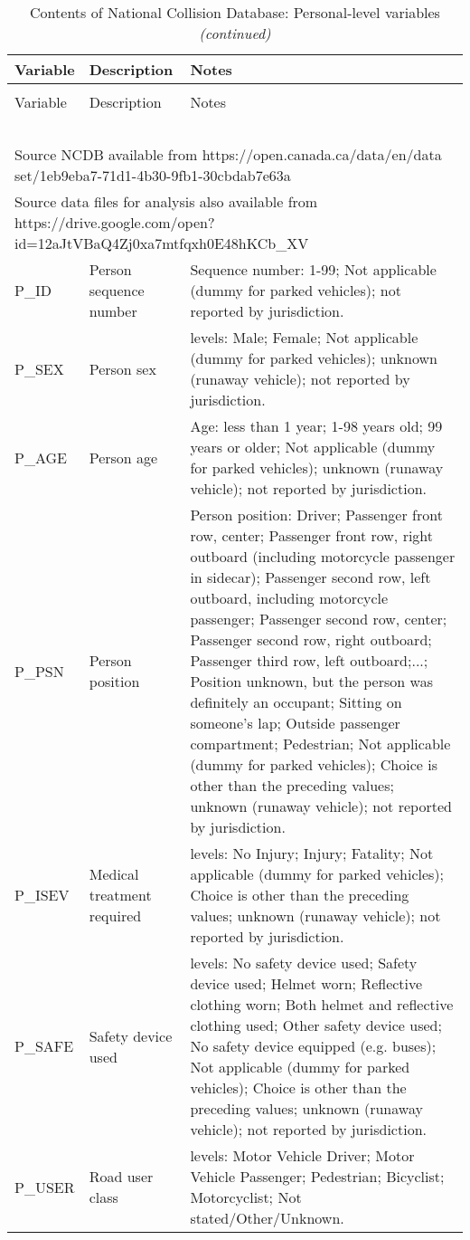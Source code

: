 \documentclass[]{elsarticle} %
\begin{document}
\begin{longtable}[t]{ll>{\raggedright\arraybackslash}p{32em}}
\caption{\label{tab:ncdb-descriptives-person}\label{tab:ncdb-descriptives-person}Contents of National Collision Database: Personal-level variables}\\
\toprule
Variable & Description & Notes\\
\midrule
\endfirsthead
\caption[]{\label{tab:ncdb-descriptives-person}Contents of National Collision Database: Personal-level variables \textit{(continued)}}\\
\toprule
Variable & Description & Notes\\
\midrule
\endhead
\
\endfoot
\bottomrule
\multicolumn{3}{l}{\textit{Note: }}\\
\multicolumn{3}{l}{Source NCDB available from https://open.canada.ca/data/en/data set/1eb9eba7-71d1-4b30-9fb1-30cbdab7e63a}\\
\multicolumn{3}{l}{Source data files for analysis also available from https://drive.google.com/open?id=12aJtVBaQ4Zj0xa7mtfqxh0E48hKCb\_XV}\\
\endlastfoot
\rowcolor{gray!6}  P\_ID & Person sequence number & Sequence number: 1-99; Not applicable (dummy for parked vehicles); not reported by jurisdiction.\\
P\_SEX & Person sex & 5 levels: Male; Female; Not applicable (dummy for parked vehicles); unknown (runaway vehicle); not reported by jurisdiction.\\
\rowcolor{gray!6}  P\_AGE & Person age & Age: less than 1 year; 1-98 years old; 99 years or older; Not applicable (dummy for parked vehicles); unknown (runaway vehicle); not reported by jurisdiction.\\
P\_PSN & Person position & Person position: Driver; Passenger front row, center; Passenger front row, right outboard (including motorcycle passenger in sidecar); Passenger second row, left outboard, including motorcycle passenger; Passenger second row, center; Passenger second row, right outboard; Passenger third row, left outboard;...; Position unknown, but the person was definitely an occupant; Sitting on someone’s lap; Outside passenger compartment; Pedestrian; Not applicable (dummy for parked vehicles); Choice is other than the preceding values; unknown (runaway vehicle); not reported by jurisdiction.\\
\rowcolor{gray!6}  P\_ISEV & Medical treatment required & 6 levels: No Injury; Injury; Fatality; Not applicable (dummy for parked vehicles); Choice is other than the preceding values; unknown (runaway vehicle); not reported by jurisdiction.\\
\addlinespace
P\_SAFE & Safety device used & 11 levels: No safety device used; Safety device used; Helmet worn; Reflective clothing worn; Both helmet and reflective clothing used; Other safety device used; No safety device equipped   (e.g. buses); Not applicable (dummy for parked vehicles); Choice is other than the preceding values; unknown (runaway vehicle); not reported by jurisdiction.\\
\rowcolor{gray!6}  P\_USER & Road user class & 6 levels: Motor Vehicle Driver; Motor Vehicle Passenger; Pedestrian; Bicyclist; Motorcyclist; Not stated/Other/Unknown.\\*
\end{longtable}
\end{document}
